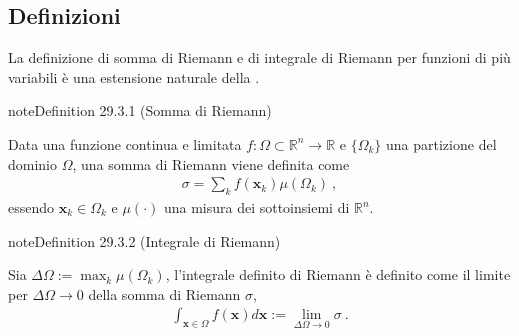 \documentclass[letterpaper,10pt,italian]{jupyterBook}
\begin{document}
\subsection{Definizioni}
\label{\detokenize{ch/multivariable-calculus/integrals:definizioni}}\label{\detokenize{ch/multivariable-calculus/integrals:multivariable-calculus-integrals-def}}
\sphinxAtStartPar
La definizione di somma di Riemann e di integrale di Riemann per funzioni di più variabili è una estensione naturale della {\hyperref[\detokenize{ch/infinitesimal_calculus/integrals:infinitesimal-calculus-integrals-def}]{}}.
\label{ch/multivariable-calculus/integrals:multivariable-calculus:integrals:def:riemann-sum}
\begin{sphinxadmonition}{note}{Definition 29.3.1 (Somma di Riemann)}



\sphinxAtStartPar
Data una funzione continua e limitata \(f: \Omega \subset \mathbb{R}^n \rightarrow \mathbb{R}\) e \(\{ \Omega_k \}\) una partizione del dominio \(\Omega\), una somma di Riemann viene definita come
\begin{equation*}
\begin{split}\sigma = \sum_{k} f(\mathbf{x}_k) \mu(\Omega_k) \ ,\end{split}
\end{equation*}
\sphinxAtStartPar
essendo \(\mathbf{x}_k \in \Omega_k\) e \(\mu(\cdot)\) una misura dei sottoinsiemi di \(\mathbb{R}^n\).
\end{sphinxadmonition}
\label{ch/multivariable-calculus/integrals:multivariable-calculus:integrals:def:riemann-integral}
\begin{sphinxadmonition}{note}{Definition 29.3.2 (Integrale di Riemann)}



\sphinxAtStartPar
Sia \(\Delta \Omega := \max_k \mu(\Omega_k)\), l’integrale definito di Riemann è definito come il limite per \(\Delta \Omega \rightarrow 0\) della somma di Riemann \(\sigma\),
\begin{equation*}
\begin{split}\int_{\mathbf{x} \in \Omega} f(\mathbf{x}) d \mathbf{x} := \lim_{\Delta \Omega \rightarrow 0} \sigma \ .\end{split}
\end{equation*}\end{sphinxadmonition}

\sphinxAtStartPar
{} 
\end{document}
